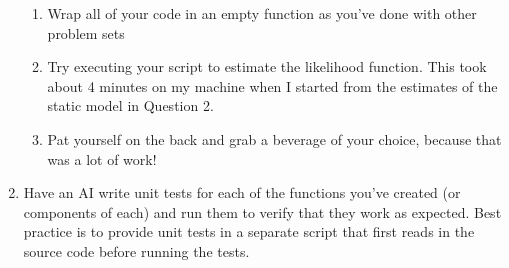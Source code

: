 \documentclass[12pt,english]{article}
\begin{document}
\begin{enumerate}
\begin{enumerate}
    \item Wrap all of your code in an empty function as you've done with other problem sets
    \item Try executing your script to estimate the likelihood function. This took about 4 minutes on my machine when I started from the estimates of the static model in Question 2.
    \item Pat yourself on the back and grab a beverage of your choice, because that was a lot of work!
    \end{enumerate}



\item Have an AI write unit tests for each of the functions you've created (or components of each) and run them to verify that they work as expected. Best practice is to provide unit tests in a separate script that first reads in the source code before running the tests.


\end{enumerate}
\end{document}
